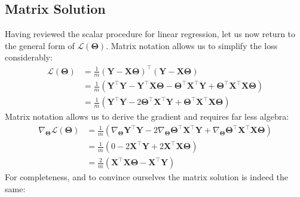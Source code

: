 \documentclass[12pt,initial,twoside,maitrise]{dms}
\numberwithin{equation}{section}
\numberwithin{table}{chapter}
\numberwithin{figure}{chapter}
\begin{document}
\subsection{Matrix Solution}

Having reviewed the scalar procedure for linear regression, let us now return to the general form of $\mathcal L(\mathbf{\Theta})$. Matrix notation allows us to simplify the loss considerably:
%
\begin{align}
\mathcal L(\mathbf{\Theta}) & = \frac{1}{m} (\mathbf Y - \mathbf X \mathbf \Theta)^\intercal(\mathbf Y - \mathbf X \mathbf \Theta) \\ &= \frac{1}{m} (\mathbf Y^\intercal \mathbf Y - \mathbf Y^\intercal \mathbf X \mathbf \Theta - \mathbf \Theta^\intercal \mathbf X^\intercal \mathbf Y + \mathbf \Theta^\intercal \mathbf X^\intercal \mathbf X \mathbf \Theta) \\ &= \frac{1}{m} (\mathbf Y^\intercal \mathbf Y - 2 \mathbf \Theta^\intercal \mathbf X^\intercal \mathbf Y + \mathbf \Theta^\intercal \mathbf X^\intercal \mathbf X \mathbf \Theta)
\end{align}
%
Matrix notation allows us to derive the gradient and requires far less algebra:
%
\begin{align}
\nabla_{\mathbf{\Theta}}\mathcal L(\mathbf{\Theta}) & = \frac{1}{m} (\nabla_{\mathbf{\Theta}}\mathbf Y^\intercal \mathbf Y - 2 \nabla_{\mathbf{\Theta}} \mathbf \Theta^\intercal \mathbf X^\intercal \mathbf Y + \nabla_{\mathbf{\Theta}}\mathbf \Theta^\intercal \mathbf X^\intercal \mathbf X \mathbf \Theta) \\ & = \frac{1}{m} ( 0 - 2\mathbf{X}^\intercal \mathbf Y + 2 \mathbf{X}^\intercal \mathbf X \mathbf \Theta ) \\ & = \boxed{\frac{2}{m} (\mathbf{X}^\intercal \mathbf X \mathbf \Theta - \mathbf{X}^\intercal \mathbf Y)}
\end{align}
%
For completeness, and to convince ourselves the matrix solution is indeed the same:
%
\end{document}
